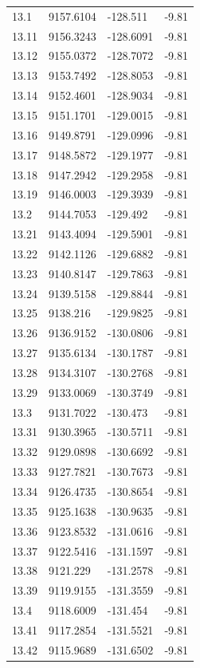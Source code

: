 \begin{table}[H]
\begin{tabular}{llll}
13.1 & 9157.6104 & -128.511 & -9.81 \\
13.11 & 9156.3243 & -128.6091 & -9.81 \\
13.12 & 9155.0372 & -128.7072 & -9.81 \\
13.13 & 9153.7492 & -128.8053 & -9.81 \\
13.14 & 9152.4601 & -128.9034 & -9.81 \\
13.15 & 9151.1701 & -129.0015 & -9.81 \\
13.16 & 9149.8791 & -129.0996 & -9.81 \\
13.17 & 9148.5872 & -129.1977 & -9.81 \\
13.18 & 9147.2942 & -129.2958 & -9.81 \\
13.19 & 9146.0003 & -129.3939 & -9.81 \\
13.2 & 9144.7053 & -129.492 & -9.81 \\
13.21 & 9143.4094 & -129.5901 & -9.81 \\
13.22 & 9142.1126 & -129.6882 & -9.81 \\
13.23 & 9140.8147 & -129.7863 & -9.81 \\
13.24 & 9139.5158 & -129.8844 & -9.81 \\
13.25 & 9138.216 & -129.9825 & -9.81 \\
13.26 & 9136.9152 & -130.0806 & -9.81 \\
13.27 & 9135.6134 & -130.1787 & -9.81 \\
13.28 & 9134.3107 & -130.2768 & -9.81 \\
13.29 & 9133.0069 & -130.3749 & -9.81 \\
13.3 & 9131.7022 & -130.473 & -9.81 \\
13.31 & 9130.3965 & -130.5711 & -9.81 \\
13.32 & 9129.0898 & -130.6692 & -9.81 \\
13.33 & 9127.7821 & -130.7673 & -9.81 \\
13.34 & 9126.4735 & -130.8654 & -9.81 \\
13.35 & 9125.1638 & -130.9635 & -9.81 \\
13.36 & 9123.8532 & -131.0616 & -9.81 \\
13.37 & 9122.5416 & -131.1597 & -9.81 \\
13.38 & 9121.229 & -131.2578 & -9.81 \\
13.39 & 9119.9155 & -131.3559 & -9.81 \\
13.4 & 9118.6009 & -131.454 & -9.81 \\
13.41 & 9117.2854 & -131.5521 & -9.81 \\
13.42 & 9115.9689 & -131.6502 & -9.81 \\

\end{tabular}
\end{table}
